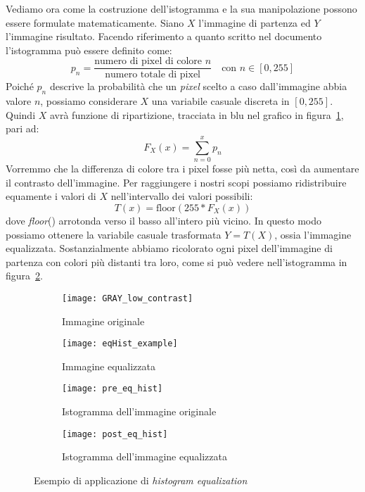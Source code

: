 Vediamo ora come la costruzione dell'istogramma e la sua manipolazione possono essere formulate matematicamente.
Siano $X$ l'immagine di partenza ed $Y$ l'immagine risultato.
Facendo riferimento a quanto scritto nel documento~\cite{hist-eq} l'istogramma può essere definito come:
\begin{equation*}
p_n = \frac{\text{numero di pixel di colore $n$}}{\text{numero totale di pixel}} \quad \text{con $n$} \in [0,255]
\end{equation*}
Poiché $p_n$ descrive la probabilità che un \textit{pixel} scelto a caso dall'immagine abbia valore $n$, possiamo considerare $X$ una variabile casuale discreta in $[0,255]$.
Quindi $X$ avrà funzione di ripartizione, tracciata in blu nel grafico in figura~\ref{fig:hist_pre_eq_example}, pari ad:
\begin{equation*}
  F_X(x) = \sum_{n=0}^{x} p_n
\end{equation*}
Vorremmo che la differenza di colore tra i pixel fosse più netta, così da aumentare il contrasto dell'immagine.
Per raggiungere i nostri scopi possiamo ridistribuire equamente i valori di $X$ nell'intervallo dei valori possibili:
\begin{equation*}
  T(x) = \text{floor}(255 * F_X(x))
\end{equation*}
dove \textit{floor}() arrotonda verso il basso all'intero più vicino.
In questo modo possiamo ottenere la variabile casuale trasformata $Y=T(X)$, ossia l'immagine equalizzata.
Sostanzialmente abbiamo ricolorato ogni pixel dell'immagine di partenza con colori più distanti tra loro, come si può vedere nell'istogramma in figura~\ref{fig:hist_post_eq_example}.

\clearpage
\begin{figure}[ht]
  \begin{center}
  \begin{subfigure}{.49\linewidth}
    \centering\texttt{[image: GRAY\_low\_contrast]}
    \caption{Immagine originale}
  \end{subfigure}
  \begin{subfigure}{.49\linewidth}
    \centering\texttt{[image: eqHist\_example]}
    \caption{Immagine equalizzata}
  \end{subfigure}
  \begin{subfigure}{.73\linewidth}
    \centering\texttt{[image: pre\_eq\_hist]}
    \caption{Istogramma dell'immagine originale}
    \label{fig:hist_pre_eq_example}
  \end{subfigure}
  \begin{subfigure}{.73\linewidth}
    \centering\texttt{[image: post\_eq\_hist]}
    \caption{Istogramma dell'immagine equalizzata}
    \label{fig:hist_post_eq_example}
  \end{subfigure}
  \end{center}
  \caption{Esempio di applicazione di \textit{histogram equalization}}
    \label{fig:hist_eq_example}
\end{figure}

